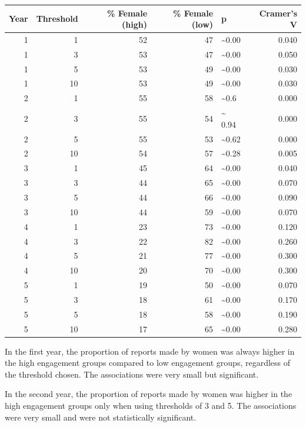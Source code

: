 \documentclass[
]{article}
\begin{document}
\begin{longtable}[]{@{}rrrrlr@{}}
\toprule
Year & Threshold & \% Female (high) & \% Female (low) & p & Cramer's
V \\
\midrule
\endhead
1 & 1 & 52 & 47 & \textasciitilde0.00 & 0.040 \\
1 & 3 & 53 & 47 & \textasciitilde0.00 & 0.050 \\
1 & 5 & 53 & 49 & \textasciitilde0.00 & 0.030 \\
1 & 10 & 53 & 49 & \textasciitilde0.00 & 0.030 \\
2 & 1 & 55 & 58 & \textasciitilde0.6 & 0.000 \\
2 & 3 & 55 & 54 & \textasciitilde{} 0.94 & 0.000 \\
2 & 5 & 55 & 53 & \textasciitilde0.62 & 0.000 \\
2 & 10 & 54 & 57 & \textasciitilde0.28 & 0.005 \\
3 & 1 & 45 & 64 & \textasciitilde0.00 & 0.040 \\
3 & 3 & 44 & 65 & \textasciitilde0.00 & 0.070 \\
3 & 5 & 44 & 66 & \textasciitilde0.00 & 0.090 \\
3 & 10 & 44 & 59 & \textasciitilde0.00 & 0.070 \\
4 & 1 & 23 & 73 & \textasciitilde0.00 & 0.120 \\
4 & 3 & 22 & 82 & \textasciitilde0.00 & 0.260 \\
4 & 5 & 21 & 77 & \textasciitilde0.00 & 0.300 \\
4 & 10 & 20 & 70 & \textasciitilde0.00 & 0.300 \\
5 & 1 & 19 & 50 & \textasciitilde0.00 & 0.070 \\
5 & 3 & 18 & 61 & \textasciitilde0.00 & 0.170 \\
5 & 5 & 18 & 58 & \textasciitilde0.00 & 0.190 \\
5 & 10 & 17 & 65 & \textasciitilde0.00 & 0.280 \\
\bottomrule
\end{longtable}

In the first year, the proportion of reports made by women was always
higher in the high engagement groups compared to low engagement groups,
regardless of the threshold chosen. The associations were very small but
significant.

In the second year, the proportion of reports made by women was higher
in the high engagement groups only when using thresholds of 3 and 5. The
associations were very small and were not statistically significant.
\end{document}
